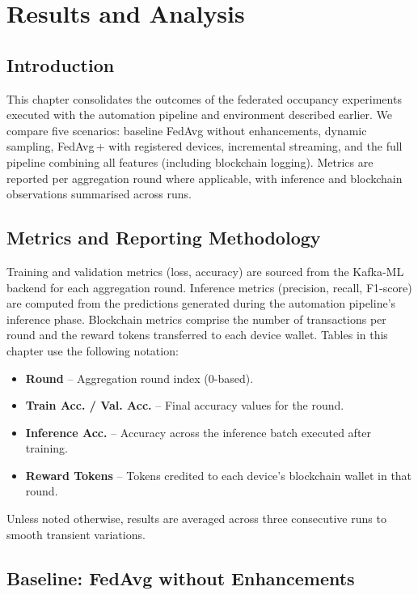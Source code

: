 \chapter{Results and Analysis}
\label{chap:results}

\section{Introduction}

This chapter consolidates the outcomes of the federated occupancy experiments executed with the automation pipeline and environment described earlier. We compare five scenarios: baseline FedAvg without enhancements, dynamic sampling, FedAvg\,+ with registered devices, incremental streaming, and the full pipeline combining all features (including blockchain logging). Metrics are reported per aggregation round where applicable, with inference and blockchain observations summarised across runs.

\section{Metrics and Reporting Methodology}

Training and validation metrics (loss, accuracy) are sourced from the Kafka-ML backend for each aggregation round. Inference metrics (precision, recall, F1-score) are computed from the predictions generated during the automation pipeline’s inference phase. Blockchain metrics comprise the number of transactions per round and the reward tokens transferred to each device wallet. Tables in this chapter use the following notation:

\begin{itemize}
    \item \textbf{Round} – Aggregation round index (0-based).
    \item \textbf{Train Acc. / Val. Acc.} – Final accuracy values for the round.
    \item \textbf{Inference Acc.} – Accuracy across the inference batch executed after training.
    \item \textbf{Reward Tokens} – Tokens credited to each device’s blockchain wallet in that round.
\end{itemize}

Unless noted otherwise, results are averaged across three consecutive runs to smooth transient variations.

\section{Baseline: FedAvg without Enhancements}

